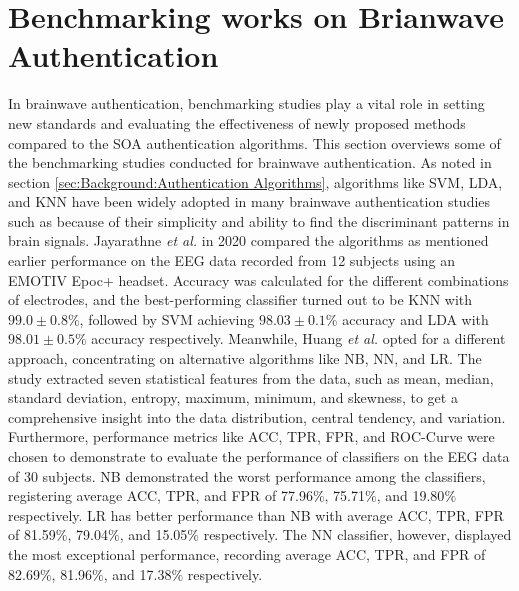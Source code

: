 \section{Benchmarking works on Brianwave Authentication}
\label{sec:Related Work:Benchmarking works on Brianwave Authentication}
In brainwave authentication, benchmarking studies play a vital role in setting new standards and evaluating the effectiveness of newly proposed methods compared to the SOA authentication algorithms. This section overviews some of the benchmarking studies conducted for brainwave authentication. As noted in section \ref{sec:Background:Authentication Algorithms}, algorithms like SVM, LDA, and KNN have been widely adopted in many brainwave authentication studies such as \cite{kaur2017novel, jayarathne2016brainid, zuquete2010biometric} because of their simplicity and ability to find the discriminant patterns in brain signals. Jayarathne \textit{et al.} \cite{jayarathne2020person} in 2020 compared the algorithms as mentioned earlier performance on the EEG data recorded from 12 subjects using an EMOTIV Epoc+ headset. Accuracy was calculated for the different combinations of electrodes, and the best-performing classifier turned out to be KNN with $99.0 \pm 0.8\%$, followed by SVM achieving $98.03 \pm 0.1\%$ accuracy and LDA with $98.01 \pm 0.5\%$ accuracy respectively. Meanwhile, Huang \textit{et al.} \cite{huang2019eeg} opted for a different approach, concentrating on alternative algorithms like NB, NN, and LR. The study extracted seven statistical features from the data, such as mean, median, standard deviation, entropy, maximum, minimum, and skewness, to get a comprehensive insight into the data distribution, central tendency, and variation. 
Furthermore, performance metrics like ACC, TPR, FPR, and ROC-Curve were chosen to demonstrate to evaluate the performance of classifiers on the EEG data of 30 subjects. NB demonstrated the worst performance among the classifiers, registering average ACC, TPR, and FPR of 77.96$\%$, 75.71$\%$, and 19.80$\%$ respectively. LR has better performance than NB with average ACC, TPR, FPR of 81.59$\%$, 79.04$\%$, and 15.05$\%$ respectively. The NN classifier, however, displayed the most exceptional performance, recording average ACC, TPR, and FPR of 82.69$\%$, 81.96$\%$, and 17.38$\%$ respectively.

